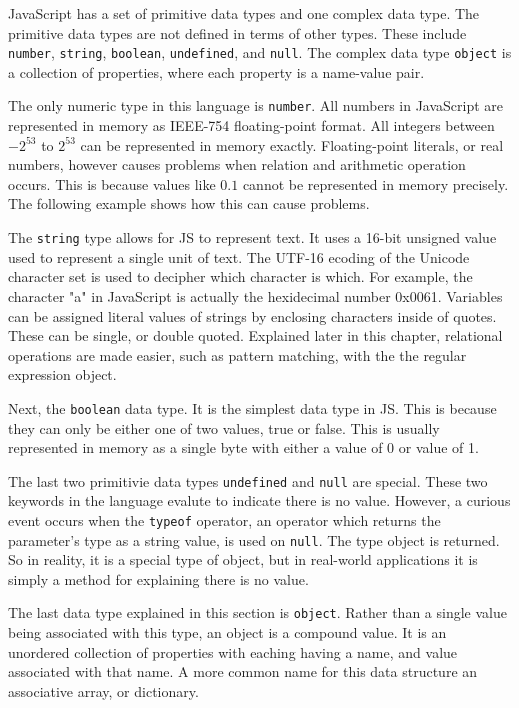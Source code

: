 \documentclass[man]{apa}
\begin{document}
JavaScript has a set of primitive data types and one complex data type. The primitive data types are not defined in terms of other types. These include \texttt{number}, \texttt{string}, \texttt{boolean}, \texttt{undefined}, and \texttt{null}. The complex data type \texttt{object} is a collection of properties, where each property is a name-value pair. 

The only numeric type in this language is \texttt{number}. All numbers in JavaScript are represented in memory as IEEE-754 floating-point format. All integers between $ -2^{53} $ to $ 2^{53} $ can be represented in memory exactly. Floating-point literals, or real numbers, however causes problems when relation and arithmetic operation occurs. This is because values like $ 0.1 $ cannot be represented in memory precisely. The following example shows how this can cause problems.



The \texttt{string} type allows for JS to represent text. It uses a 16-bit unsigned value used to represent a single unit of text. The UTF-16 ecoding of the Unicode character set is used to decipher which character is which. For example, the character "a" in JavaScript is actually the hexidecimal number 0x0061. Variables can be assigned literal values of strings by enclosing characters inside of quotes. These can be single, or double quoted. Explained later in this chapter, relational operations are made easier, such as pattern matching, with the the regular expression object.

Next, the \texttt{boolean} data type. It is the simplest data type in JS. This is because they can only be either one of two values, true or false. This is usually represented in memory as a single byte with either a value of 0 or value of 1.

The last two primitivie data types \texttt{undefined} and \texttt{null} are special. These two keywords in the language evalute to indicate there is no value. However, a curious event occurs when the \texttt{typeof} operator, an operator which returns the parameter's type as a string value, is used on \texttt{null}. The type object is returned. So in reality, it is a special type of object, but in real-world applications it is simply a method for explaining there is no value.

The last data type explained in this section is \texttt{object}. Rather than a single value being associated with this type, an object is a compound value. It is an unordered collection of properties with eaching having a name, and value associated with that name. A more common name for this data structure an associative array, or dictionary.
\end{document}
